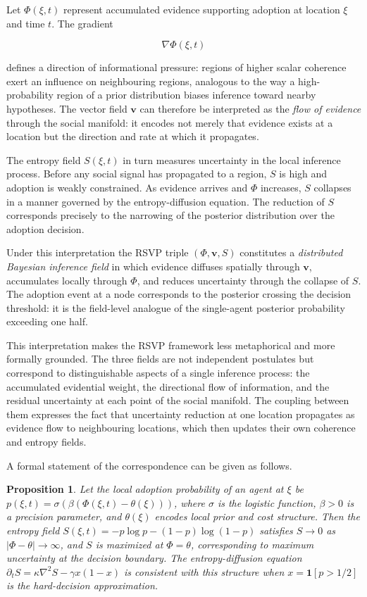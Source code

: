\documentclass[12pt,a4paper]{article}
\theoremstyle{plain}
\newtheorem{proposition}[theorem]{Proposition}
\theoremstyle{definition}
\begin{document}
Let $\Phi(\xi,t)$ represent accumulated evidence supporting adoption at location $\xi$ and time $t$. The gradient

\begin{equation}
\nabla \Phi(\xi,t)
\end{equation}

defines a direction of informational pressure: regions of higher scalar coherence exert an influence on neighbouring regions, analogous to the way a high-probability region of a prior distribution biases inference toward nearby hypotheses. The vector field $\mathbf{v}$ can therefore be interpreted as the \emph{flow of evidence} through the social manifold: it encodes not merely that evidence exists at a location but the direction and rate at which it propagates.

The entropy field $S(\xi,t)$ in turn measures uncertainty in the local inference process. Before any social signal has propagated to a region, $S$ is high and adoption is weakly constrained. As evidence arrives and $\Phi$ increases, $S$ collapses in a manner governed by the entropy-diffusion equation. The reduction of $S$ corresponds precisely to the narrowing of the posterior distribution over the adoption decision.

Under this interpretation the RSVP triple $(\Phi, \mathbf{v}, S)$ constitutes a \emph{distributed Bayesian inference field} in which evidence diffuses spatially through $\mathbf{v}$, accumulates locally through $\Phi$, and reduces uncertainty through the collapse of $S$. The adoption event at a node corresponds to the posterior crossing the decision threshold: it is the field-level analogue of the single-agent posterior probability exceeding one half.

This interpretation makes the RSVP framework less metaphorical and more formally grounded. The three fields are not independent postulates but correspond to distinguishable aspects of a single inference process: the accumulated evidential weight, the directional flow of information, and the residual uncertainty at each point of the social manifold. The coupling between them expresses the fact that uncertainty reduction at one location propagates as evidence flow to neighbouring locations, which then updates their own coherence and entropy fields.

A formal statement of the correspondence can be given as follows.

\begin{proposition}
\label{prop:rsvpbayes}
Let the local adoption probability of an agent at $\xi$ be $p(\xi,t) = \sigma(\beta(\Phi(\xi,t) - \theta(\xi)))$, where $\sigma$ is the logistic function, $\beta > 0$ is a precision parameter, and $\theta(\xi)$ encodes local prior and cost structure. Then the entropy field $S(\xi,t) = -p\log p - (1-p)\log(1-p)$ satisfies $S \to 0$ as $|\Phi - \theta| \to \infty$, and $S$ is maximized at $\Phi = \theta$, corresponding to maximum uncertainty at the decision boundary. The entropy-diffusion equation $\partial_t S = \kappa \nabla^2 S - \gamma x(1-x)$ is consistent with this structure when $x = \mathbf{1}[p > 1/2]$ is the hard-decision approximation.
\end{proposition}
\end{document}
